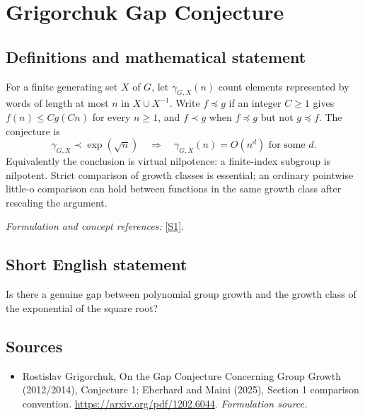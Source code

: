 \documentclass[11pt]{article}
\begin{document}
\section*{\texorpdfstring{Grigorchuk Gap Conjecture}{Grigorchuk Gap Conjecture}}\label{30006833}
\subsection{Definitions and mathematical statement}
For a finite generating set $X$ of $G$, let $\gamma_{G,X}(n)$ count elements represented by words of length at most $n$ in $X\cup X^{-1}$. Write $f\preceq g$ if an integer $C\ge1$ gives $f(n)\le Cg(Cn)$ for every $n\ge1$, and $f\prec g$ when $f\preceq g$ but not $g\preceq f$. The conjecture is
\[
 \gamma_{G,X}\prec\exp(\sqrt n)\quad\Longrightarrow\quad
 \gamma_{G,X}(n)=O(n^d)\text{ for some }d.
\]
Equivalently the conclusion is virtual nilpotence: a finite-index subgroup is nilpotent. Strict comparison of growth classes is essential; an ordinary pointwise little-o comparison can hold between functions in the same growth class after rescaling the argument.
\par\smallskip\textit{Formulation and concept references:} \href{https://arxiv.org/pdf/1202.6044}{[S1]}.

\subsection{Short English statement}
Is there a genuine gap between polynomial group growth and the growth class of the exponential of the square root?
\subsection{Sources}
\begin{itemize}
\item[S1]Rostislav Grigorchuk, On the Gap Conjecture Concerning Group Growth (2012/2014), Conjecture 1; Eberhard and Maini (2025), Section 1 comparison convention.
\url{https://arxiv.org/pdf/1202.6044}.
\textit{Formulation source.}
\end{itemize}
\end{document}
